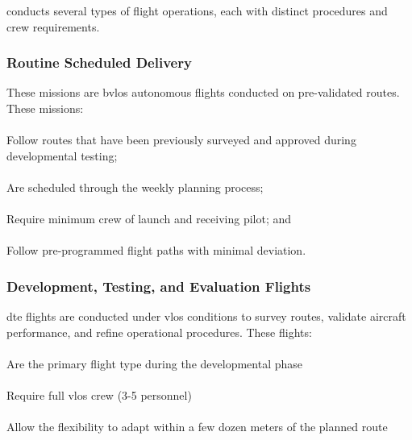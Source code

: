     \projectmars{} conducts several types of flight operations, each with distinct procedures and crew requirements.
    
    \subsubsection{Routine Scheduled Delivery}\label{ssec:routinedelivery} These missions are \ac{bvlos} autonomous flights conducted on pre-validated routes. These missions:
    
        \paragraph{} Follow routes that have been previously surveyed and approved during developmental testing;
        \paragraph{} Are scheduled through the weekly planning process;
        \paragraph{} Require minimum crew of launch  and receiving pilot; and
        \paragraph{} Follow pre-programmed flight paths with minimal deviation.
    
    \subsubsection{Development, Testing, and Evaluation Flights}\label{ssec:testflights} \ac{dte} flights are conducted under \ac{vlos} conditions to survey routes, validate aircraft performance, and refine operational procedures. These flights:
    
        \paragraph{} Are the primary flight type during the developmental phase
        \paragraph{} Require full \ac{vlos} crew (3-5 personnel)
        \paragraph{} Allow the  flexibility to adapt within a few dozen meters of the planned route
